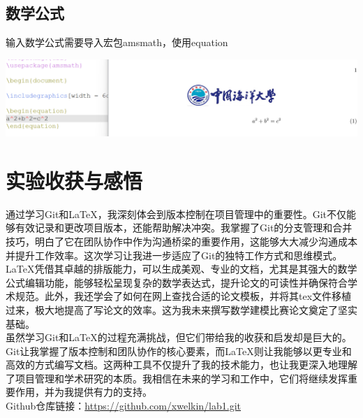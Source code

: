 \documentclass[UTF8,a4paper]{ctexart}
\begin{document}
\begin{sloppypar}
	\subsection{数学公式}
	输入数学公式需要导入宏包amsmath，使用equation
	
	\includegraphics[width = 16cm]{20}

	\section{实验收获与感悟}
	通过学习Git和LaTeX，我深刻体会到版本控制在项目管理中的重要性。Git不仅能够有效记录和更改项目版本，还能帮助解决冲突。我掌握了Git的分支管理和合并技巧，明白了它在团队协作中作为沟通桥梁的重要作用，这能够大大减少沟通成本并提升工作效率。这次学习让我进一步适应了Git的独特工作方式和思维模式。\\
	\indent LaTeX凭借其卓越的排版能力，可以生成美观、专业的文档，尤其是其强大的数学公式编辑功能，能够轻松呈现复杂的数学表达式，提升论文的可读性并确保符合学术规范。此外，我还学会了如何在网上查找合适的论文模板，并将其tex文件移植过来，极大地提高了写论文的效率。这为我未来撰写数学建模比赛论文奠定了坚实基础。\\
	\indent 虽然学习Git和LaTeX的过程充满挑战，但它们带给我的收获和启发却是巨大的。Git让我掌握了版本控制和团队协作的核心要素，而LaTeX则让我能够以更专业和高效的方式编写文档。这两种工具不仅提升了我的技术能力，也让我更深入地理解了项目管理和学术研究的本质。我相信在未来的学习和工作中，它们将继续发挥重要作用，并为我提供有力的支持。\\
	
	Github仓库链接：\url{https://github.com/xwelkin/lab1.git}
	
\end{sloppypar}
\end{document}
